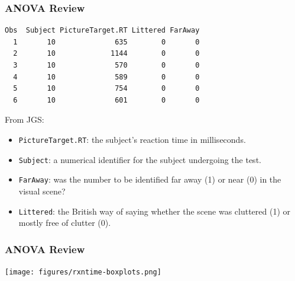 \documentclass[slidestop,compress,mathserif,12pt,t,professionalfonts,xcolor=table]{beamer}
\begin{document}

\begin{frame}[fragile]
  \frametitle{ANOVA Review}
  
\begin{center}
{\small
\begin{verbatim}
Obs  Subject PictureTarget.RT Littered FarAway
  1       10              635        0       0
  2       10             1144        0       0
  3       10              570        0       0
  4       10              589        0       0
  5       10              754        0       0
  6       10              601        0       0
\end{verbatim}
}
\end{center}

\small
{\tiny From JGS:}
\begin{itemize}
\item \texttt{PictureTarget.RT}: the subject’s reaction time in milliseconds.
\item \texttt{Subject}: a numerical identifier for the subject undergoing the test.
\item \texttt{FarAway}: was the number to be identified far away (1) or near (0) in the visual scene?
\item \texttt{Littered}: the British way of saying whether the scene was cluttered (1) or mostly free of clutter (0).
\end{itemize}

\end{frame}



\begin{frame}
  \frametitle{ANOVA Review}


  \begin{center}
  \texttt{[image: figures/rxntime-boxplots.png]}
  \end{center}

\end{frame}


\end{document}
